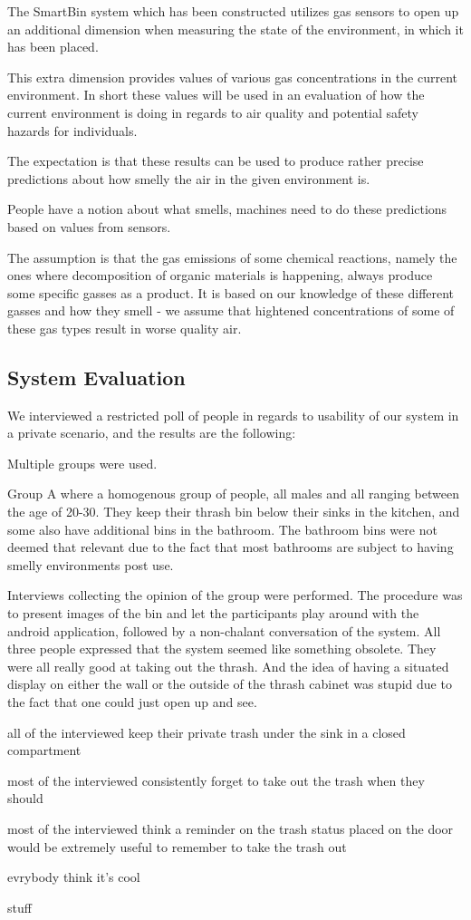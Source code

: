 The SmartBin system which has been constructed utilizes gas sensors to open up an additional dimension when measuring the state of the environment, in which it has been placed.

This extra dimension provides values of various gas concentrations in the current environment.
In short these values will be used in an evaluation of how the current environment is doing in regards to air quality and potential safety hazards for individuals.

The expectation is that these results can be used to produce rather precise predictions about how smelly the air in the given environment is.

People have a notion about what smells, machines need to do these predictions based on values from sensors.

The assumption is that the gas emissions of some chemical reactions, namely the ones where decomposition of organic materials is happening, always produce some specific gasses as a product.
It is based on our knowledge of these different gasses and how they smell - we assume that hightened concentrations of some of these gas types result in worse quality air.


\subsection{System Evaluation}

We interviewed a restricted poll of people in regards to usability of our system in a private scenario, and the results are the following:

Multiple groups were used.

Group A where a homogenous group of people, all males and all ranging between the age of 20-30.
They keep their thrash bin below their sinks in the kitchen, and some also have additional bins in the bathroom.
The bathroom bins were not deemed that relevant due to the fact that most bathrooms are subject to having smelly environments post use.

Interviews collecting the opinion of the group  were performed.
The procedure was to present images of the bin and let the participants play around with the android application, followed by a non-chalant conversation of the system.
All three people expressed that the system seemed like something obsolete. They were all really good at taking out the thrash.
And the idea of having a situated display on either the wall or the outside of the thrash cabinet was stupid due to the fact that one could just open up and see.

all of the interviewed keep their private trash under the sink in a closed compartment

most of the interviewed consistently forget to take out the trash when they should

most of the interviewed think a reminder on the trash status placed on the door would be extremely useful to remember to take the trash out

evrybody think it's cool

stuff
